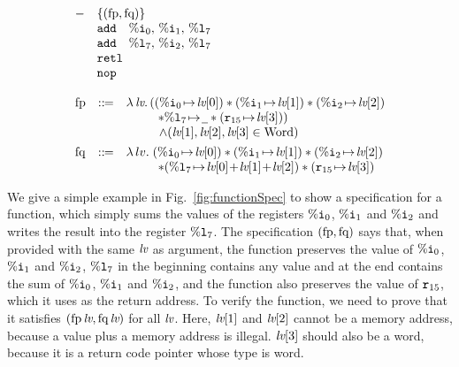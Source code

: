 \begin{center}
	\vspace*{-2em}
	$$
	\begin{array}{l}
		\begin{array}{ll}
			- & \{(\text{fp}, \text{fq})\} \\
			& \cadd \quad \ireg{0}, \, \ireg{1}, \, \lreg{7} \\
			& \cadd \quad \lreg{7}, \, \ireg{2}, \, \lreg{7} \\
			& \retl \\
			& \nop
		\end{array} \\
		\\
		\begin{array}{lcl}
			\text{fp} & \define &
			\lambda \, \lv.\,
			((\regst{\ireg{0}}{\lv[0]})
			* (\regst{\ireg{1}}{\lv[1]})
			* (\regst{\ireg{2}}{\lv[2]}) \\
			& &
			\hspace*{6ex} * \regst{\lreg{7}}{\notCare}
						  * (\regst{\reg{15}}{\lv[3]}))
			\\
			& &
			\qquad \ \
			\land
			(\lv[1], \lv[2], \lv[3] \in \TYPE{Word}) \\
			
			\\[-8pt]
			
			\text{fq} & \define & \lambda \, lv. \;
			(\regst{\ireg{0}}{\lv[0]})
			* (\regst{\ireg{1}}{\lv[1]})
			* (\regst{\ireg{2}}{\lv[2]}) \\
			& &
			\hspace*{6ex}
			* (\regst{\lreg{7}}{\lv[0] \!+\! \lv[1] \!+\! \lv[2]})
						  * (\regst{\reg{15}}{\lv[3]})
		\end{array}
	\end{array}
	$$
	\vspace*{-0.5em}
	\label{fig:functionSpec}
\end{center}

We give a simple example in Fig.~\ref{fig:functionSpec}
to show a specification for a function, which simply
sums the values of the registers $\%\texttt{i}_{0}$, $\%\texttt{i}_{1}$ and $\%\texttt{i}_{2}$
and writes the result into the register $\%\texttt{l}_{7}$.
The specification $(\text{fp},\text{fq})$ says that, when
provided with the same $\textit{lv}$ as argument, the function
preserves the value of $\%\texttt{i}_{0}$, $\%\texttt{i}_{1}$ and $\%\texttt{i}_{2}$,
$\%\texttt{l}_{7}$ in the beginning contains any value and
at the end contains the sum of $\%\texttt{i}_{0}$, $\%\texttt{i}_{1}$ and $\%\texttt{i}_{2}$,
and the function also preserves the value of $\texttt{r}_{15}$,
which it uses as the return address.
To verify the function, we need to prove that it satisfies
$(\text{fp}\,\textit{lv}, \text{fq}\,\textit{lv})$ for all $\textit{lv}$.
Here, $\textit{lv}[1]$ and $\textit{lv}[2]$ cannot be a memory address,
because a value plus a memory address is illegal.
$\textit{lv}[3]$ should also be a word, because it is a
return code pointer whose type is word.


